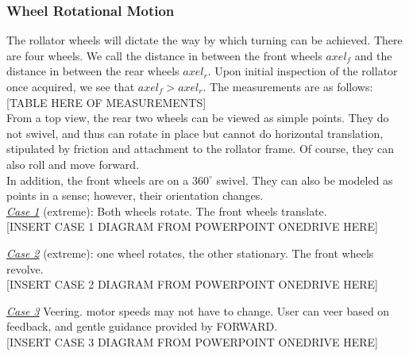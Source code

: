 \subsubsection{Wheel Rotational Motion}
\noindent The rollator wheels will dictate the way by which turning can be achieved. There are four wheels. We call the distance in between the front wheels $axel_f$ and the distance in between the rear wheels $axel_r$. Upon initial inspection of the rollator once acquired, we see that $axel_f > axel_r$. The measurements are as follows:\\

[TABLE HERE OF MEASUREMENTS]\\

\noindent From a top view, the rear two wheels can be viewed as simple points. They do not swivel, and thus can rotate in place but cannot do horizontal translation, stipulated by friction and attachment to the rollator frame. Of course, they can also roll and move forward.\\

\noindent In addition, the front wheels are on a $360^{\circ}$ swivel. They can also be modeled as points in a sense; however, their orientation changes.\\

\noindent \underline{\textit{Case 1}} (extreme): Both wheels rotate. The front wheels translate.\\

[INSERT CASE 1 DIAGRAM FROM POWERPOINT ONEDRIVE HERE]

\noindent \underline{\textit{Case 2}} (extreme): one wheel rotates, the other stationary. The front wheels revolve.\\

[INSERT CASE 2 DIAGRAM FROM POWERPOINT ONEDRIVE HERE]

\noindent \underline{\textit{Case 3}} Veering. motor speeds may not have to change. User can veer based on feedback, and gentle guidance provided by FORWARD.\\

[INSERT CASE 3 DIAGRAM FROM POWERPOINT ONEDRIVE HERE]

